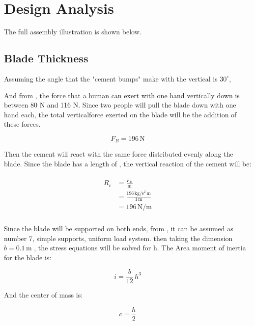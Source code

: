 \documentclass[11pt]{article}
\begin{document}
\section{Design Analysis}

The full assembly illustration is shown below.

\subsection{Blade Thickness}

Assuming the angle that the "cement bumps" make with the vertical is $30^\circ$,

And from \cite[Figure 9.10]{shigley}, the force that a human can exert with one hand vertically down is between 80 N and 116 N. Since two people will pull the blade down with one hand each, the total verticalforce exerted on the blade will be the addition of these forces.

\begin{equation}
F_{B}	= 196\,\mathrm{N}
\end{equation}

Then the cement will react with the same force distributed evenly along the blade. Since the blade has a length of  , the vertical reaction of the cement will be:

\begin{align}
\begin{split}
R_{c}	&= \frac{F_{B}}{\mathrm{m}}\\
		&= \frac{196\,\mathrm{{kg}\slash{s^{2}} \, m}}{1\,\mathrm{m}}\\
		&= 196\,\mathrm{{N}\slash{m}}\\
\end{split}
\end{align}

Since the blade will be supported on both ends, from \cite[Table A-9]{shigley}, it can be assumed as number 7, simple supports, uniform load system. then taking the dimension 
 $b = 0.1\,\mathrm{m}$ , the stress equations will be solved for h. The Area moment of inertia for the blade is:

\begin{equation}
i=\frac{b}{12} \, h^{3}
\end{equation}

And the center of mass is:

\begin{equation}
c=\frac{h}{2}
\end{equation}
\end{document}
